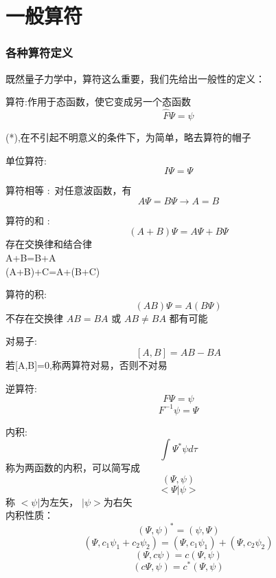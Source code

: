 \section{一般算符}

\begin{frame} [allowframebreaks=]
    \frametitle{各种算符定义}
    既然量子力学中，算符这么重要，我们先给出一般性的定义：
    \begin{definition}
        算符:作用于态函数，使它变成另一个态函数
        $$ \hat{F} \Psi=\psi$$
    \end{definition}
    (*),在不引起不明意义的条件下，为简单，略去算符的帽子
    \begin{definition}
        单位算符:
        $$ I\Psi=\Psi $$
    \end{definition}
    \begin{definition}
        算符相等 : 对任意波函数，有
        $$ A\Psi=B\Psi \to A=B $$
    \end{definition}
    \begin{definition}
        算符的和 : 
        $$ (A+B)\Psi=A\Psi+B\Psi $$
        存在交换律和结合律\\
        A+B=B+A\\
        (A+B)+C=A+(B+C)
    \end{definition}
    \begin{definition}
        算符的积: 
        $$ (AB)\Psi=A(B\Psi) $$
        不存在交换律
        $AB=BA$ 或 $AB\ne BA$ 都有可能
    \end{definition}
    \begin{definition}
        对易子: 
        $$ [A,B]=AB-BA$$
        若[A,B]=0,称两算符对易，否则不对易
    \end{definition}
    \begin{definition}
        逆算符: 
        $$ F\Psi=\psi $$
        $$ F^{-1}\psi=\Psi $$
    \end{definition}
    \begin{definition}
        内积: 
        $$ \int\Psi^*\psi d \tau$$
        称为两函数的内积，可以简写成
        $$ (\Psi,\psi)$$ 
        $$ <\Psi|\psi>$$
        称 $ <\psi|$为左矢， $|\psi>$为右矢\\
        内积性质：
        $$ (\Psi,\psi)^*=(\psi,\Psi)$$ 
        $$ (\Psi,c_1\psi_1+c_2\psi_2)=(\Psi,c_1\psi_1)+(\Psi,c_2\psi_2)$$ 
        $$ (\Psi,c\psi)=c(\Psi,\psi)$$ 
        $$ (c\Psi,\psi)=c^*(\Psi,\psi)$$ 
    \end{definition} 
    \begin{definition}

\end{definition}
\end{frame}
